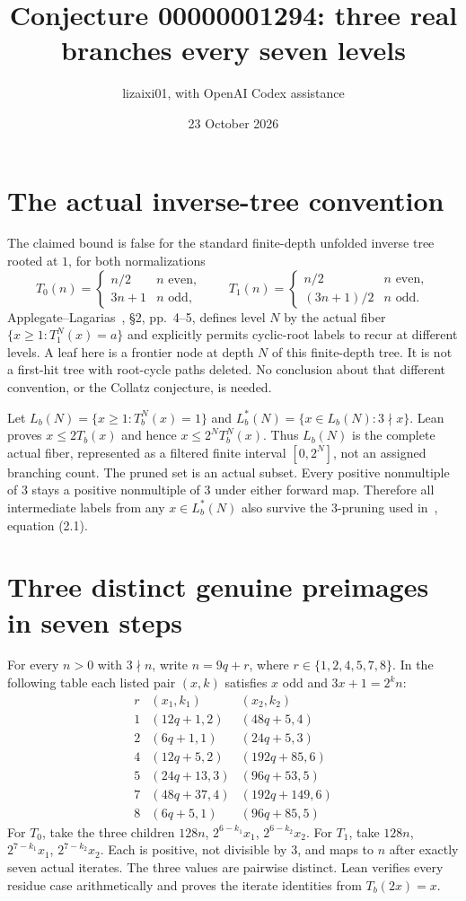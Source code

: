 \documentclass[11pt]{article}
\title{Conjecture 00000001294: three real branches every seven levels}
\author{lizaixi01, with OpenAI Codex assistance}
\date{23 October 2026}
\begin{document}
\maketitle
\section{The actual inverse-tree convention}
The claimed bound is false for the standard finite-depth unfolded
inverse tree rooted at $1$, for both normalizations
\[
 T_0(n)=\begin{cases}n/2&n\text{ even},\\3n+1&n\text{ odd},\end{cases}
 \qquad
 T_1(n)=\begin{cases}n/2&n\text{ even},\\(3n+1)/2&n\text{ odd}.\end{cases}
\]
Applegate--Lagarias~\cite{AL}, \S2, pp.~4--5, defines level $N$
by the actual fiber $\{x\ge1:T_1^N(x)=a\}$ and explicitly permits
cyclic-root labels to recur at different levels. A leaf here is a
frontier node at depth $N$ of this finite-depth tree. It is not a
first-hit tree with root-cycle paths deleted. No conclusion about
that different convention, or the Collatz conjecture, is needed.

Let $L_b(N)=\{x\ge1:T_b^N(x)=1\}$ and
$L_b^*(N)=\{x\in L_b(N):3\nmid x\}$. Lean proves
$x\le2T_b(x)$ and hence $x\le2^N T_b^N(x)$.
Thus $L_b(N)$ is the complete actual fiber, represented as a
filtered finite interval $[0,2^N]$, not an assigned branching count.
The pruned set is an actual subset. Every positive nonmultiple
of $3$ stays a positive nonmultiple of $3$ under either forward
map. Therefore all intermediate labels from any $x\in L_b^*(N)$
also survive the $3$-pruning used in~\cite{AL}, equation (2.1).

\section{Three distinct genuine preimages in seven steps}
For every $n>0$ with $3\nmid n$, write $n=9q+r$, where
$r\in\{1,2,4,5,7,8\}$. In the following table each listed pair
$(x,k)$ satisfies $x$ odd and $3x+1=2^k n$:
\[
\begin{array}{c|cc}
r&(x_1,k_1)&(x_2,k_2)\\\hline
1&(12q+1,2)&(48q+5,4)\\
2&(6q+1,1)&(24q+5,3)\\
4&(12q+5,2)&(192q+85,6)\\
5&(24q+13,3)&(96q+53,5)\\
7&(48q+37,4)&(192q+149,6)\\
8&(6q+5,1)&(96q+85,5)
\end{array}
\]
For $T_0$, take the three children
$128n$, $2^{6-k_1}x_1$, $2^{6-k_2}x_2$.
For $T_1$, take $128n$, $2^{7-k_1}x_1$, $2^{7-k_2}x_2$.
Each is positive, not divisible by $3$, and maps to $n$ after
exactly seven actual iterates. The three values are pairwise
distinct. Lean verifies every residue case arithmetically and
proves the iterate identities from $T_b(2x)=x$.
\end{document}

